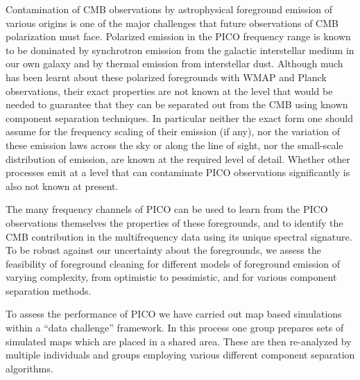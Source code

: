 \documentclass[PICOReport.tex]{subfiles}
\begin{document}

Contamination of CMB observations by astrophysical foreground emission of various origins is one of the major challenges that future observations of CMB polarization must face. Polarized emission in the PICO frequency range is known to be dominated by synchrotron emission from the galactic interstellar medium in our own galaxy and by thermal emission from interstellar dust. Although much has been learnt about these polarized foregrounds with WMAP and Planck observations, their exact properties are not known at the level that would be needed to guarantee that they can be separated out from the CMB using known component separation techniques. In particular neither the exact form one should assume for the frequency scaling of their emission (if any), nor the variation of these emission laws across the sky or along the line of sight, nor the small-scale distribution of emission, are known at the required level of detail. Whether other processes emit at a level that can contaminate PICO observations significantly is also not known at present. 

The many frequency channels of PICO can be used to learn from the PICO observations themselves the properties of these foregrounds, and to identify the CMB contribution in the multifrequency data using its unique spectral signature. To be robust against our uncertainty about the foregrounds, we assess the feasibility of foreground cleaning for different models of foreground emission of varying complexity, from optimistic to pessimistic, and for various component separation methods. 

To assess the performance of PICO we have carried out map based
simulations within a ``data challenge'' framework.
In this process one group prepares sets of simulated maps which are
placed in a shared area.
These are then re-analyzed by multiple individuals and groups employing various
different component separation algorithms.
\end{document}
